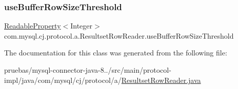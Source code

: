\mbox{\label{classcom_1_1mysql_1_1cj_1_1protocol_1_1a_1_1_resultset_row_reader_a76822f083abe98e2b745d5b7cb91d90b}} 
\subsubsection{\texorpdfstring{use\+Buffer\+Row\+Size\+Threshold}{useBufferRowSizeThreshold}}
{\footnotesize\ttfamily \mbox{\hyperlink{interfacecom_1_1mysql_1_1cj_1_1conf_1_1_readable_property}{Readable\+Property}}$<$Integer$>$ com.\+mysql.\+cj.\+protocol.\+a.\+Resultset\+Row\+Reader.\+use\+Buffer\+Row\+Size\+Threshold\hspace{0.3cm}{\ttfamily [protected]}}



The documentation for this class was generated from the following file\+:\begin{DoxyCompactItemize}
\item 
pruebas/mysql-\/connector-\/java-\/8../src/main/protocol-\/impl/java/com/mysql/cj/protocol/a/\mbox{\hyperlink{_resultset_row_reader_8java}{Resultset\+Row\+Reader.\+java}}\end{DoxyCompactItemize}
